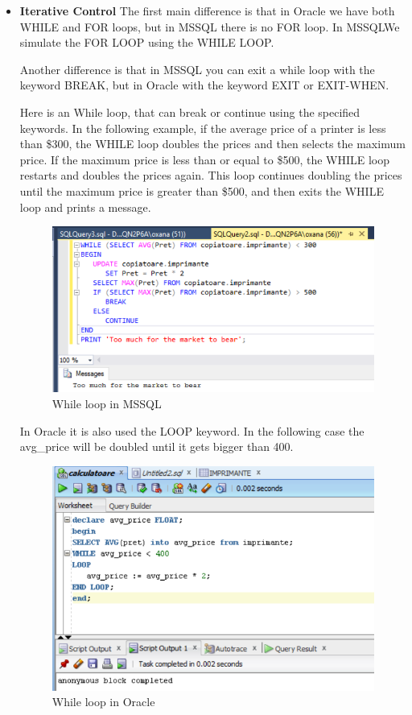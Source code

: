 \begin{itemize}
\item \textbf{Iterative Control}\newline
 The first main difference is that in Oracle we have both WHILE and FOR loops, but in MSSQL there is no FOR loop. In MSSQLWe simulate the FOR LOOP using the WHILE LOOP.

Another difference is that in MSSQL you can exit a while loop with the keyword BREAK, but in Oracle with the keyword EXIT or EXIT-WHEN.


Here is an While loop, that can break or continue using the specified keywords. In the following example, if the average  price of a printer is less than \$300, the WHILE loop doubles the prices and then selects the maximum price. If the maximum price is less than or equal to \$500, the WHILE loop restarts and doubles the prices again. This loop continues doubling the prices until the maximum price is greater than \$500, and then exits the WHILE loop and prints a message.\newline

\begin{figure}[ht!]
    \centering
    \includegraphics{images/example5-while.png}
    \caption{While loop in MSSQL}
    \label{fig1}
\end{figure}

In Oracle it is also used the LOOP keyword. In the following case the avg\_price will be doubled until it gets bigger than 400.
\begin{figure}[ht!]
    \centering
    \includegraphics{images/example5-whileloop.png}
    \caption{While loop in Oracle}
    \label{fig1}
\end{figure}\newline



\end{itemize}

